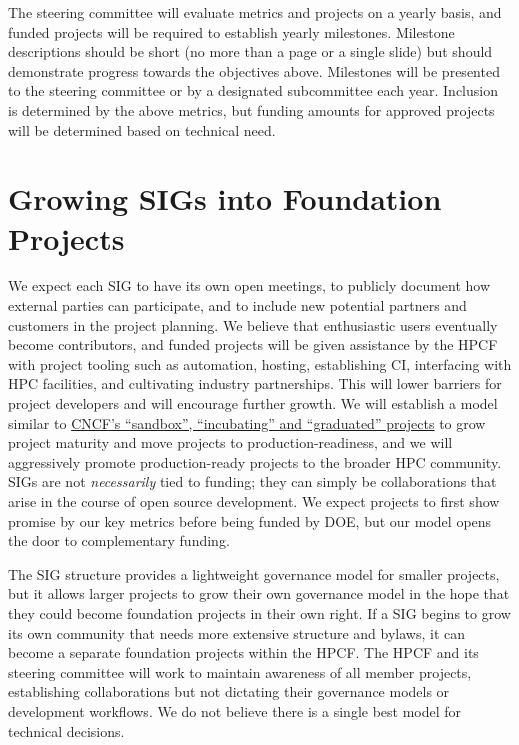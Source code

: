\documentclass[11pt]{article}
\begin{document}
The steering committee will evaluate metrics and projects on a yearly basis, and funded
projects will be required to establish yearly milestones. Milestone descriptions should
be short (no more than a page or a single slide) but should demonstrate progress towards
the objectives above. Milestones will be presented to the steering committee or by a
designated subcommittee each year. Inclusion is determined by the above metrics, but
funding amounts for approved projects will be determined based on technical need.

\section{Growing SIGs into Foundation Projects}

We expect each SIG to have its own open meetings, to publicly document how external
parties can participate, and to include new potential partners and customers in the
project planning. We believe that enthusiastic users eventually become contributors, and
funded projects will be given assistance by the HPCF with project tooling such as
automation, hosting, establishing CI, interfacing with HPC facilities, and cultivating
industry partnerships. This will lower barriers for project developers and will
encourage further growth. We will establish a model similar to
\href{https://www.cncf.io/projects/}{CNCF's ``sandbox'', ``incubating'' and
  ``graduated'' projects} to grow project maturity and move projects to
production-readiness, and we will aggressively promote production-ready projects to the
broader HPC community. SIGs are not {\it necessarily} tied to funding; they can simply
be collaborations that arise in the course of open source development. We expect
projects to first show promise by our key metrics before being funded by DOE, but our
model opens the door to complementary funding.

The SIG structure provides a lightweight governance model for smaller projects, but it
allows larger projects to grow their own governance model in the hope that they could
become foundation projects in their own right. If a SIG begins to grow its own community
that needs more extensive structure and bylaws, it can become a separate foundation
projects within the HPCF. The HPCF and its steering committee will work to maintain
awareness of all member projects, establishing collaborations but not dictating their
governance models or development workflows. We do not believe there is a single best
model for technical decisions.
\end{document}
